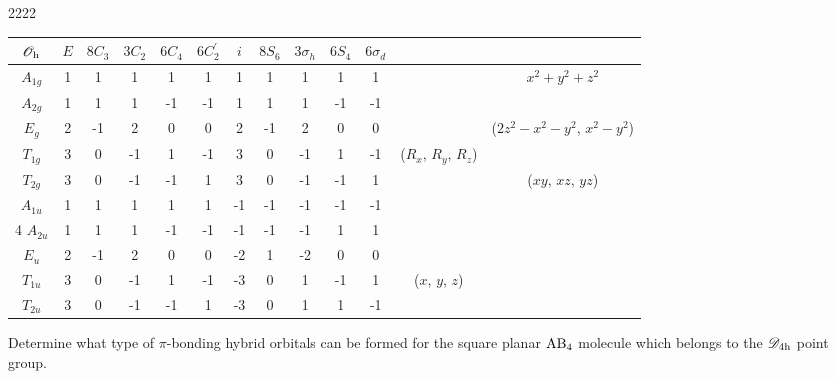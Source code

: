 \documentclass[a4paper]{book}
\begin{document}
	\begin{solution}
		2222
		
		\begin{center}
		\begin{tabular}{ccccccccccccc}\hline
	$\mathscr{O}_{\rm h}$ & $E$ & $8C_3$ &	$3C_2$	& $6C_4$	&	$6C^\prime_2$	&	$i$	&	$8S_6$	&	$3\sigma_{h}$	&	$6S_4$ &	$6\sigma_{d}$	&	&\\ \hline
			$A_{1g}$	&	1	&	1	&	1	&	1	&	1	&	1	&	1	&	1	&	1	&	1	&		&	$x^2+y^2+z^2$\\
			$A_{2g}$	&	1	&	1	&	1	&	-1	&	-1	&	1	&	1	&	1	&	-1	&	-1	& 		&	\\
			$E_g$ 		&	2	&	-1	&	2	&	0	&	0	&	2	&	-1	&	2	&	0	&	0	& 		& ($2z^2-x^2-y^2$, $x^2-y^2$)\\
			$T_{1g}$	&	3	&	0	&	-1	&	1	&	-1	&	3	&	0	&	-1	&	1	&	-1	& ($R_x$, $R_y$, $R_z$)	&	\\
			$T_{2g}$ 	&	3	&	0	&	-1	&	-1	&	1	&	3	&	0	&	-1	&	-1	&	1	&		& ($xy$, $xz$, $yz$)\\
			$A_{1u}$	&	1	&	1	&	1	&	1	&	1	&	-1	&	-1	&	-1	&	-1	&	-1	&		&	\\4
			$A_{2u}$	&	1	&	1	&	1	&	-1	&	-1	&	-1	&	-1	&	-1	&	1	&	1	&		&	\\
			$E_u$ 		&	2	&	-1	&	2	&	0	&	0	&	-2	&	1	&	-2	&	0	&	0	& 		& \\ 
			$T_{1u}$	&	3	&	0	&	-1	&	1	&	-1	&	-3	&	0	&	1	&	-1	&	1	& ($x$, $y$, $z$)	&	\\
			$T_{2u}$ 	&	3	&	0	&	-1	&	-1	&	1	&	-3	&	0	&	1	&	1	&	-1	&		&	\\	\hline
		\end{tabular}
		\end{center}
		
	\end{solution}
	
	\begin{exercise}
		Determine what type of $\pi$-bonding hybrid orbitals can be formed for the square planar $\ce{AB4}$ molecule which belongs to the $\mathscr{D}_{\rm 4h}$ point group.
	\end{exercise}
	
\end{document}
